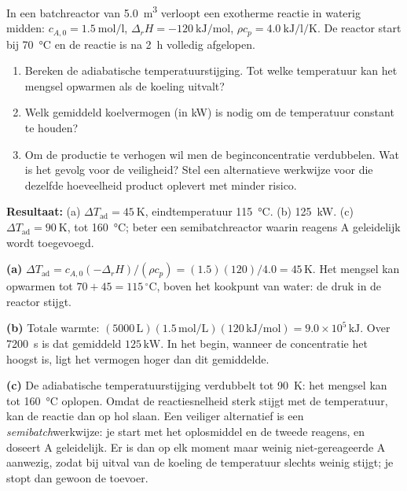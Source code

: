 \begin{oefening}
In een batchreactor van \SI{5.0}{\cubic\metre} verloopt een exotherme reactie in waterig midden: $c_{A,0} = \SI{1.5}{\mole\per\litre}$, $\Delta_r H = \SI{-120}{\kilo\joule\per\mole}$, $\rho c_p = \SI{4.0}{\kilo\joule\per\litre\per\kelvin}$. De reactor start bij \SI{70}{\celsius} en de reactie is na \SI{2}{\hour} volledig afgelopen.
\begin{enumerate}
\item[(a)] Bereken de adiabatische temperatuurstijging. Tot welke temperatuur kan het mengsel opwarmen als de koeling uitvalt?
\item[(b)] Welk gemiddeld koelvermogen (in \si{\kilo\watt}) is nodig om de temperatuur constant te houden?
\item[(c)] Om de productie te verhogen wil men de beginconcentratie verdubbelen. Wat is het gevolg voor de veiligheid? Stel een alternatieve werkwijze voor die dezelfde hoeveelheid product oplevert met minder risico.
\end{enumerate}
\end{oefening}
\begin{oplossing}
\textbf{Resultaat:} (a) $\Delta T_\mathrm{ad} = \SI{45}{\kelvin}$, eindtemperatuur \SI{115}{\celsius}. (b) \SI{125}{\kilo\watt}. (c) $\Delta T_\mathrm{ad} = \SI{90}{\kelvin}$, tot \SI{160}{\celsius}; beter een semibatchreactor waarin reagens A geleidelijk wordt toegevoegd.

\textbf{(a)} $\Delta T_\mathrm{ad} = c_{A,0}(-\Delta_r H)/(\rho c_p) = (1.5)(120)/4.0 = 45\,\mathrm{K}$. Het mengsel kan opwarmen tot $70 + 45 = 115\,{}^\circ\mathrm{C}$, boven het kookpunt van water: de druk in de reactor stijgt.

\textbf{(b)} Totale warmte: $(5000\,\mathrm{L})(1.5\,\mathrm{mol/L})(120\,\mathrm{kJ/mol}) = 9.0\times10^5\,\mathrm{kJ}$. Over \SI{7200}{\second} is dat gemiddeld $125\,\mathrm{kW}$. In het begin, wanneer de concentratie het hoogst is, ligt het vermogen hoger dan dit gemiddelde.

\textbf{(c)} De adiabatische temperatuurstijging verdubbelt tot \SI{90}{\kelvin}: het mengsel kan tot \SI{160}{\celsius} oplopen. Omdat de reactiesnelheid sterk stijgt met de temperatuur, kan de reactie dan op hol slaan. Een veiliger alternatief is een \emph{semibatch}werkwijze: je start met het oplosmiddel en de tweede reagens, en doseert A geleidelijk. Er is dan op elk moment maar weinig niet-gereageerde A aanwezig, zodat bij uitval van de koeling de temperatuur slechts weinig stijgt; je stopt dan gewoon de toevoer.
\end{oplossing}

